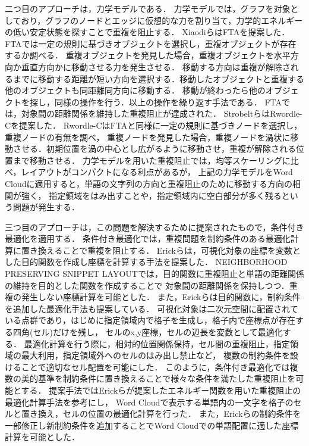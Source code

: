 \documentclass[syuuron]{kuee}
\begin{document}
		二つ目のアプローチは，力学モデルである．
		力学モデルでは，グラフを対象としており，グラフのノードとエッジに仮想的な力を割り当て，力学的エネルギーの低い安定状態を探すことで重複を阻止する．
		XiaodiらはFTAを提案した\cite{fta1}．
		FTAでは一定の規則に基づきオブジェクトを選択し，重複オブジェクトが存在するか調べる．
		重複オブジェクトを発見した場合，重複オブジェクトを水平方向か垂直方向かに移動させる力を発生させる．
		移動する方向は重複が解除されるまでに移動する距離が短い方向を選択する．移動したオブジェクトと重複する他のオブジェクトも同距離同方向に移動する．
		移動が終わったら他のオブジェクトを探し，同様の操作を行う．以上の操作を繰り返す手法である．
		FTAでは，対象間の距離関係を維持した重複阻止が達成された．
		StrobeltらはRwordle-Cを提案した\cite{rwc1}．
		Rwordle-CはFTAと同様に一定の規則に基づきノードを選択し，重複ノードの有無を調べ，
		重複ノードを発見した場合，重複ノードを渦状に移動させる．初期位置を渦の中心とし広がるように移動させ，重複が解除される位置まで移動させる．
		力学モデルを用いた重複阻止では，均等スケーリングに比べ，レイアウトがコンパクトになる利点があるが，
		上記の力学モデルをWord Cloudに適用すると，単語の文字列の方向と重複阻止のために移動する方向の相関が強く，
		指定領域をはみ出すことや，指定領域内に空白部分が多く残るという問題が発生する．
		
		三つ目のアプローチは，この問題を解決するために提案されたもので，条件付き最適化を適用する．
		条件付き最適化では，重複問題を制約条件のある最適化計算に置き換えることで重複を阻止する．
		Erickらは，可視化対象の座標を変数とした目的関数を作成し座標を計算する手法を提案した\cite{or1}．
		NEIGHBORHOOD PRESERVING SNIPPET LAYOUTでは，目的関数に重複阻止と単語の距離関係の維持を目的とした関数を作成することで
		対象間の距離関係を保持しつつ．重複の発生しない座標計算を可能とした．
		また，Erickらは目的関数に，制約条件を追加した最適化手法も提案している\cite{or2}． 
		可視化対象は二次元空間に配置されている点群であり，はじめに指定領域内で格子を生成し，格子内で座標点が存在する四角(セル)だけを残し，
		セルのx,y座標，セルの辺長を変数として最適化する．
		最適化計算を行う際に，相対的位置関係保持，セル間の重複阻止，指定領域の最大利用，指定領域外へのセルのはみ出し禁止など，
		複数の制約条件を設けることで適切なセル配置を可能にした．
		このように，条件付き最適化では複数の美的基準を制約条件に置き換えることで様々な条件を満たした重複阻止を可能とする．
		提案手法ではErickらが提案したエネルギー関数を用いた重複阻止の最適化計算手法を参考にし，
		Word Cloudで表示する単語内の一文字を格子のセルと置き換え，セルの位置の最適化計算を行った．
		また，Erickらの制約条件を一部修正し新制約条件を追加することでWord Cloudでの単語配置に適した座標計算を可能とした．
		
\end{document}
